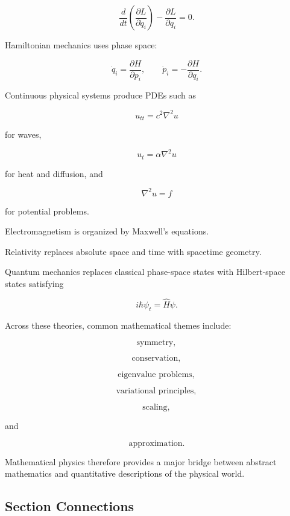 \[
\boxed{
\frac{d}{dt}
\left(
\frac{\partial L}{\partial\dot q_i}
\right)
-
\frac{\partial L}{\partial q_i}
=
0.
}
\]

Hamiltonian mechanics uses phase space:

\[
\boxed{
\dot q_i
=
\frac{\partial H}{\partial p_i},
\qquad
\dot p_i
=
-\frac{\partial H}{\partial q_i}.
}
\]

Continuous physical systems produce PDEs such as

\[
\boxed{
u_{tt}
=
c^2\nabla^2u
}
\]

for waves,

\[
\boxed{
u_t
=
\alpha\nabla^2u
}
\]

for heat and diffusion, and

\[
\boxed{
\nabla^2u=f
}
\]

for potential problems.

Electromagnetism is organized by Maxwell's equations.

Relativity replaces absolute space and time with spacetime geometry.

Quantum mechanics replaces classical phase-space states with Hilbert-space
states satisfying

\[
\boxed{
i\hbar\psi_t
=
\hat H\psi.
}
\]

Across these theories, common mathematical themes include:

\[
\boxed{
\text{symmetry},
}
\]

\[
\boxed{
\text{conservation},
}
\]

\[
\boxed{
\text{eigenvalue problems},
}
\]

\[
\boxed{
\text{variational principles},
}
\]

\[
\boxed{
\text{scaling},
}
\]

and

\[
\boxed{
\text{approximation}.
}
\]

Mathematical physics therefore provides a major bridge between abstract
mathematics and quantitative descriptions of the physical world.

\subsection{Section Connections}
\label{subsec:mathematical-physics-connections}


